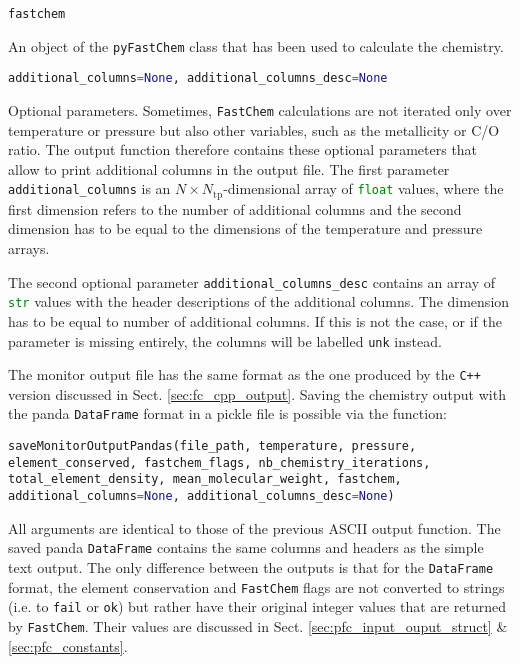 \documentclass[numbers=noenddot]{fcmanual}
\newcommand{\fc}{\texttt{FastChem}\xspace}
\newcommand{\pfc}{\texttt{pyFastChem}\xspace}
\newcommand{\cpp}{\ttt{C++}\xspace}
\newcommand{\ttt}[1]{\texttt {#1}}
\begin{document}
\bigbreak

\lstinline[language=Python]!fastchem!
\begin{addmargin}[25pt]{0pt}
	An object of the \pfc class that has been used to calculate the chemistry. 
\end{addmargin}

\bigbreak

\lstinline[language=Python]!additional_columns=None, additional_columns_desc=None!
\begin{addmargin}[25pt]{0pt}
	Optional parameters. Sometimes, \fc calculations are not iterated only over temperature or pressure but also other variables, such as the metallicity or C/O ratio. The output function therefore contains these optional parameters that allow to print additional columns in the output file. The first parameter \lstinline[language=Python]!additional_columns! is an $N\times N_\mathrm{tp}$-dimensional array of \lstinline[language=Python]!float! values, where the first dimension refers to the number of additional columns and the second dimension has to be equal to the dimensions of the temperature and pressure arrays. 
	
	The second optional parameter \lstinline[language=Python]!additional_columns_desc! contains an array of \lstinline[language=Python]!str! values with the header descriptions of the additional columns. The dimension has to be equal to number of additional columns. If this is not the case, or if the parameter is missing entirely, the columns will be labelled \texttt{unk} instead.
\end{addmargin}

\bigbreak

The monitor output file has the same format as the one produced by the \cpp version discussed in Sect. \ref{sec:fc_cpp_output}. Saving the chemistry output with the panda \lstinline[language=Python]!DataFrame! format in a pickle file is possible via the function:

\bigbreak

\lstinline[language=Python, breaklines, breakatwhitespace]!saveMonitorOutputPandas(file_path, temperature, pressure, element_conserved, fastchem_flags, nb_chemistry_iterations, total_element_density, mean_molecular_weight, fastchem, additional_columns=None, additional_columns_desc=None)!

\bigbreak

All arguments are identical to those of the previous ASCII output function. The saved panda \lstinline[language=Python]!DataFrame! contains the same columns and headers as the simple text output. The only difference between the outputs is that for the \lstinline[language=Python]!DataFrame! format, the element conservation and \fc flags are not converted to strings (i.e. to \texttt{fail} or \texttt{ok}) but rather have their original integer values that are returned by \fc. Their values are discussed in Sect. \ref{sec:pfc_input_ouput_struct}  \& \ref{sec:pfc_constants}.
\end{document}

